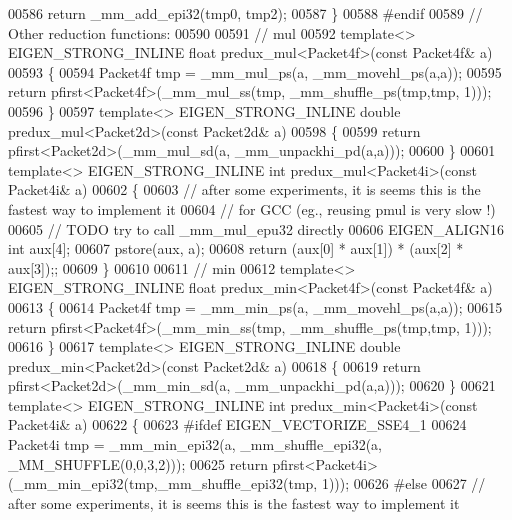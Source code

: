 \begin{DoxyCode}
00586   \textcolor{keywordflow}{return} \_mm\_add\_epi32(tmp0, tmp2);
00587 \}
00588 \textcolor{preprocessor}{#endif}
00589 \textcolor{comment}{// Other reduction functions:}
00590 
00591 \textcolor{comment}{// mul}
00592 \textcolor{keyword}{template}<> EIGEN\_STRONG\_INLINE \textcolor{keywordtype}{float} predux\_mul<Packet4f>(\textcolor{keyword}{const} Packet4f& a)
00593 \{
00594   Packet4f tmp = \_mm\_mul\_ps(a, \_mm\_movehl\_ps(a,a));
00595   \textcolor{keywordflow}{return} pfirst<Packet4f>(\_mm\_mul\_ss(tmp, \_mm\_shuffle\_ps(tmp,tmp, 1)));
00596 \}
00597 \textcolor{keyword}{template}<> EIGEN\_STRONG\_INLINE \textcolor{keywordtype}{double} predux\_mul<Packet2d>(\textcolor{keyword}{const} Packet2d& a)
00598 \{
00599   \textcolor{keywordflow}{return} pfirst<Packet2d>(\_mm\_mul\_sd(a, \_mm\_unpackhi\_pd(a,a)));
00600 \}
00601 \textcolor{keyword}{template}<> EIGEN\_STRONG\_INLINE \textcolor{keywordtype}{int} predux\_mul<Packet4i>(\textcolor{keyword}{const} Packet4i& a)
00602 \{
00603   \textcolor{comment}{// after some experiments, it is seems this is the fastest way to implement it}
00604   \textcolor{comment}{// for GCC (eg., reusing pmul is very slow !)}
00605   \textcolor{comment}{// TODO try to call \_mm\_mul\_epu32 directly}
00606   EIGEN\_ALIGN16 \textcolor{keywordtype}{int} aux[4];
00607   pstore(aux, a);
00608   \textcolor{keywordflow}{return}  (aux[0] * aux[1]) * (aux[2] * aux[3]);;
00609 \}
00610 
00611 \textcolor{comment}{// min}
00612 \textcolor{keyword}{template}<> EIGEN\_STRONG\_INLINE \textcolor{keywordtype}{float} predux\_min<Packet4f>(\textcolor{keyword}{const} Packet4f& a)
00613 \{
00614   Packet4f tmp = \_mm\_min\_ps(a, \_mm\_movehl\_ps(a,a));
00615   \textcolor{keywordflow}{return} pfirst<Packet4f>(\_mm\_min\_ss(tmp, \_mm\_shuffle\_ps(tmp,tmp, 1)));
00616 \}
00617 \textcolor{keyword}{template}<> EIGEN\_STRONG\_INLINE \textcolor{keywordtype}{double} predux\_min<Packet2d>(\textcolor{keyword}{const} Packet2d& a)
00618 \{
00619   \textcolor{keywordflow}{return} pfirst<Packet2d>(\_mm\_min\_sd(a, \_mm\_unpackhi\_pd(a,a)));
00620 \}
00621 \textcolor{keyword}{template}<> EIGEN\_STRONG\_INLINE \textcolor{keywordtype}{int} predux\_min<Packet4i>(\textcolor{keyword}{const} Packet4i& a)
00622 \{
00623 \textcolor{preprocessor}{#ifdef EIGEN\_VECTORIZE\_SSE4\_1}
00624   Packet4i tmp = \_mm\_min\_epi32(a, \_mm\_shuffle\_epi32(a, \_MM\_SHUFFLE(0,0,3,2)));
00625   \textcolor{keywordflow}{return} pfirst<Packet4i>(\_mm\_min\_epi32(tmp,\_mm\_shuffle\_epi32(tmp, 1)));
00626 \textcolor{preprocessor}{#else}
00627   \textcolor{comment}{// after some experiments, it is seems this is the fastest way to implement it}

\end{DoxyCode}
